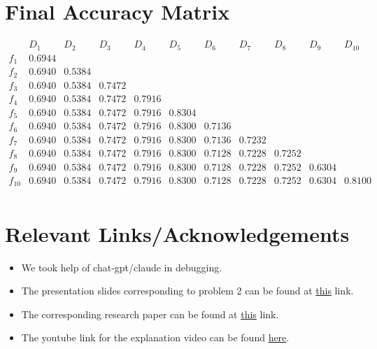 \documentclass{article} %
\begin{document}
\section*{Final Accuracy Matrix}
\[
\begin{array}{c|cccccccccc}
 & D_1 & D_2 & D_3 & D_4 & D_5 & D_6 & D_7 & D_8 & D_9 & D_{10} \\
\hline
f_1  & 0.6944 &       &       &       &       &       &       &       &       &       \\
f_2  & 0.6940 & 0.5384 &       &       &       &       &       &       &       &       \\
f_3  & 0.6940 & 0.5384 & 0.7472 &       &       &       &       &       &       &       \\
f_4  & 0.6940 & 0.5384 & 0.7472 & 0.7916 &       &       &       &       &       &       \\
f_5  & 0.6940 & 0.5384 & 0.7472 & 0.7916 & 0.8304 &       &       &       &       &       \\
f_6  & 0.6940 & 0.5384 & 0.7472 & 0.7916 & 0.8300 & 0.7136 &       &       &       &       \\
f_7  & 0.6940 & 0.5384 & 0.7472 & 0.7916 & 0.8300 & 0.7136 & 0.7232 &       &       &       \\
f_8  & 0.6940 & 0.5384 & 0.7472 & 0.7916 & 0.8300 & 0.7128 & 0.7228 & 0.7252 &       &       \\
f_9  & 0.6940 & 0.5384 & 0.7472 & 0.7916 & 0.8300 & 0.7128 & 0.7228 & 0.7252 & 0.6304 &       \\
f_{10} & 0.6940 & 0.5384 & 0.7472 & 0.7916 & 0.8300 & 0.7128 & 0.7228 & 0.7252 & 0.6304 & 0.8100 \\
\end{array}
\]


\section{Relevant Links/Acknowledgements}
\begin{itemize}
    \item We took help of chat-gpt/claude in debugging. 
    \item The presentation slides corresponding to problem 2 can be found at \href{https://drive.google.com/file/d/16M1vzTdMby0obWokpMC8oeYKSnHBBGg9/view?usp=drive_link}{this} link. 
    \item The corresponding research paper can be found at \href{https://arxiv.org/pdf/2301.10418}{this} link. 
    \item The youtube link for the explanation video can be found \href{https://youtu.be/y78fq7vCHi4?si=6zj9N_54JkJj3Ery}{here}.
\end{itemize}
\end{document}
